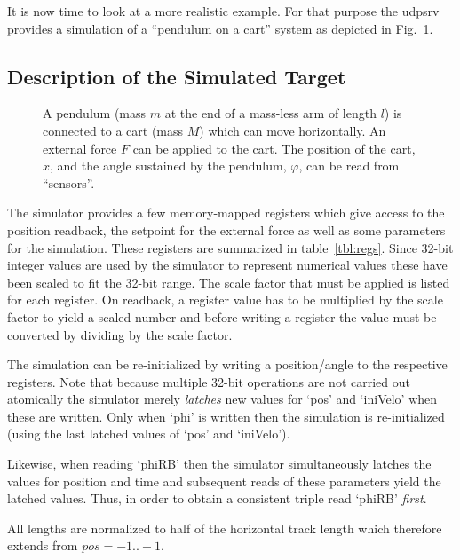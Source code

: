 \documentclass[10pt]{article}
\newcommand{\udps}      {udpsrv}
\newcounter{figs}
\newcommand{\fig}[2]{
\refstepcounter{figs}
\hspace*{\fill}\resizebox{#1}{!}{\texttt{[image: \#2]}}\hspace*{\fill}
}
\newcommand{\figr}[1]{Fig.~\ref{fig:#1}}
\begin{document}
It is now time to look at a more realistic example. For that purpose the \udps{}
provides a simulation of a ``pendulum on a cart'' system as depicted in \figr{geom}.

\subsection{Description of the Simulated Target}

\begin{figure}[ht]
\fig{0.5\textwidth}{O.Common/geom.pdf}
\label{fig:geom}
\caption{A pendulum (mass $m$ at the end of a mass-less arm of length $l$) is connected
to a cart (mass $M$) which can move horizontally. An external force $F$ can be applied
to the cart. The position of the cart, $x$, and the angle sustained by the pendulum,
$\varphi$, can be read from ``sensors''.}
\end{figure}

The simulator provides a few memory-mapped registers which give access to the
position readback, the setpoint for the external force as well as some parameters
for the simulation. These registers are summarized in table~\ref{tbl:regs}.
Since 32-bit integer values are used by the simulator to represent numerical values
these have been scaled to fit the 32-bit range. The scale factor that must be applied
is listed for each register. On readback, a register value has to be multiplied
by the scale factor to yield a scaled number and before writing a register the
value must be converted by dividing by the scale factor.

The simulation can be re-initialized by writing a position/angle to the respective
registers. Note that because multiple 32-bit operations are not carried out atomically
the simulator merely {\em latches} new values for `pos' and `iniVelo' when these
are written. Only when `phi' is written then the simulation is re-initialized
(using the last latched values of `pos' and `iniVelo').

Likewise, when reading `phiRB' then the simulator simultaneously latches the
values for position and time and subsequent reads of these parameters yield the
latched values. Thus, in order to obtain a consistent triple read `phiRB' {\em first}.

All lengths are normalized to half of the horizontal track length which therefore
extends from $pos=-1..+1$.
\end{document}
